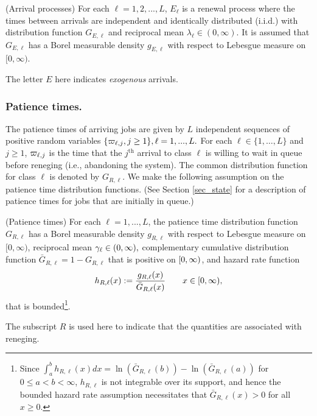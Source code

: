 \documentclass{article}
\begin{document}
\begin{assumption}\label{asm_arrival}
(Arrival processes) For each $\ell=1,2,...,L$, $E_\ell$ is a renewal process where the times between arrivals are independent and identically distributed  (i.i.d.) with distribution function $G_{E,\ell}$ and reciprocal mean $\lambda_\ell\in(0,\infty)$. It is assumed that $G_{E,\ell}$ has a Borel measurable density $g_{E,\ell}$ with respect to Lebesgue measure on $[0,\infty)$.  
\end{assumption}
\noindent The letter $E$ here indicates \textit{exogenous} arrivals. 

\subsubsection*{Patience times.}
The patience times of arriving jobs are given by $L$ independent sequences of positive random variables  $\{\varpi_{\ell,j},j\geq1\}, \ell=1,...,L.$  For each $\ell \in \{ 1,\ldots, L\}$ and $j\geq 1$, 
$\varpi_{\ell, j}$ is the time that the $j^{\text{th}}$ arrival to class $\ell $ is willing to wait in queue   before reneging (i.e., abandoning the system). 
The common distribution function for class $\ell$ is denoted by $G_{R,\ell}$.  We make the following assumption on the patience time distribution functions. 
(See Section \ref{sec_state} for a description of patience times for jobs that are initially in queue.)
\begin{assumption}\label{asm_patience}
  (Patience times) For each $\ell=1,...,L$, the patience time distribution function $G_{R,\ell}$ has a Borel measurable density $g_{R,\ell}$ with respect to Lebesgue measure on $[0,\infty)$, reciprocal mean $\gamma_{\ell}\in(0,\infty),$  complementary cumulative distribution function $\bar G_{R,\ell}=1-G_{R,\ell}$ that is positive on $[0,\infty)$, and hazard rate function 
\[
h_{R,\ell}(x):=\frac{g_{R,\ell}(x)}{\bar G_{R,\ell}(x)}\quad\quad x\in[0,\infty),
\]
that is bounded\footnote{Since $\int_a^b h_{R,\ell}(x)dx = \ln(\bar G_{R,\ell}(b)) - \ln(\bar G_{R,\ell}(a))$ for $0\leq a<b <\infty$, $h_{R,\ell}$ is not integrable over its support, and hence the   bounded hazard rate assumption necessitates that $\bar G_{R,\ell}(x)>0$ for all $x\geq 0$.}.
\end{assumption}
The subscript $R$ is used here to indicate that the quantities are associated with reneging. 
\end{document}

